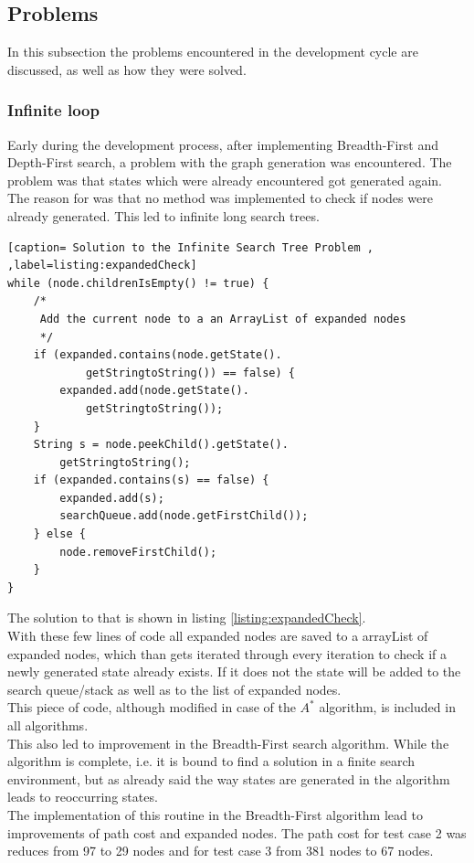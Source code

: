 \documentclass[journal]{IEEEtran}
\begin{document}
\subsection{Problems}
In this subsection the problems encountered in the development cycle are discussed, as well as how they were solved.\\

\subsubsection{Infinite loop}
Early during the development process, after implementing Breadth-First and Depth-First search, a problem with the graph generation was encountered. The problem was that states which were already encountered got generated again. \\
The reason for was that no method was implemented to check if nodes were already generated. This led to infinite long search trees.\\ 

\begin{lstlisting}[caption= Solution to the Infinite Search Tree Problem , ,label=listing:expandedCheck]
while (node.childrenIsEmpty() != true) {
	/*
	 Add the current node to a an ArrayList of expanded nodes
	 */
	if (expanded.contains(node.getState().
			getStringtoString()) == false) {
		expanded.add(node.getState().
			getStringtoString());
	}
	String s = node.peekChild().getState().
		getStringtoString();
	if (expanded.contains(s) == false) {
		expanded.add(s);
		searchQueue.add(node.getFirstChild());
	} else {
		node.removeFirstChild();
	}
}
\end{lstlisting}

The solution to that is shown in listing \ref{listing:expandedCheck}. \\
With these few lines of code all expanded nodes are saved to a arrayList of expanded nodes, which than gets iterated through every iteration to check if a newly generated state already exists. If it does not the state will be added to the search queue/stack as well as to the list of expanded nodes. \\
This piece of code, although modified in case of the $A^*$ algorithm, is included in all algorithms. \\

This also led to improvement in the Breadth-First search algorithm. While the algorithm is complete, i.e. it is bound to find a solution in a finite search environment, but as already said the way states are generated in the algorithm leads to reoccurring states.\\
The implementation of this routine in the Breadth-First algorithm lead to improvements of path cost and expanded nodes. The path cost for test case 2 was reduces from 97 to 29 nodes and for test case 3 from 381 nodes to 67 nodes.\\
\end{document}
